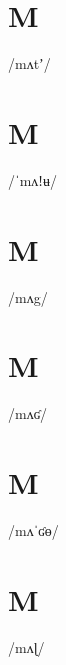 \documentclass[10pt,a4paper,twoside]{book}
\begin{document}
\section*{M}

\begin{multicols}{3}
 {/mʌtʼ/} {}
\end{multicols}

\section*{M}

\begin{multicols}{3}
 {/ˈmʌǃʉ/} {}
\end{multicols}

\section*{M}

\begin{multicols}{3}
 {/mʌg/} {}
\end{multicols}

\section*{M}

\begin{multicols}{3}
 {/mʌʛ/} {}
\end{multicols}

\section*{M}

\begin{multicols}{3}
 {/mʌˈʛɵ/} {}
\end{multicols}

\section*{M}

\begin{multicols}{3}
 {/mʌɭ/} {}
\end{multicols}
\end{document}
